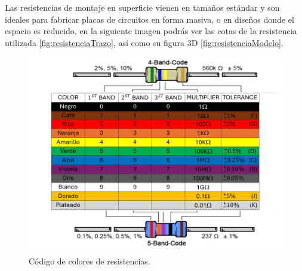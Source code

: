     Las resistencias de montaje en superficie vienen en tamaños estándar y son ideales para fabricar placas de circuitos en forma masiva, o en diseños donde el espacio es reducido, en la siguiente imagen podrás ver las cotas de la resistencia utilizada \ref{fig:resistenciaTrazo}, así como su figura 3D \ref{fig:resistenciaModelo}.
    
    \begin{figure}[H]
        \centering
        \includegraphics[scale=0.35]{15/img/codigoColoresResistencia.pdf}
        \caption{Código de colores de resistencias.}
        \label{fig:codigoColoresResistencia}
    \end{figure}
         
